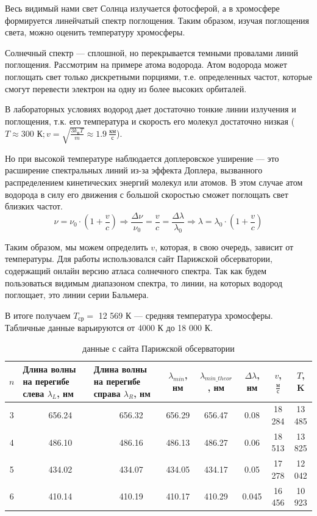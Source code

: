 \documentclass[a4paper,12pt]{article}
\begin{document}
Весь видимый нами свет Солнца излучается фотосферой, а в хромосфере формируется линейчатый спектр поглощения. Таким образом, изучая поглощения света, можно оценить температуру хромосферы.

Солнечный спектр --- сплошной, но перекрывается темными провалами линий поглощения. 
Рассмотрим на примере атома водорода. Атом водорода может поглощать свет только дискретными порциями, т.е. определенных частот, которые смогут перевести электрон на одну из более высоких орбиталей.

В лабораторных условиях водород дает достаточно тонкие линии излучения и поглощения, т.к. его температура и скорость его молекул достаточно низкая ($T \approx 300 \text{ К}; v = \sqrt{\frac{3k_{\text{Б}}T}{m}} \approx 1.9\ \frac{\text{км}}{\text{с}}$).

Но при высокой температуре наблюдается доплеровское уширение — это расширение спектральных линий из-за эффекта Доплера, вызванного распределением кинетических энергий молекул или атомов. В этом случае атом водорода в силу его движения с большой скоростью сможет поглощать свет близких частот.
\[
\nu = \nu_{0}\cdot \left(1 + \frac{v}{c}\right) \Rightarrow \frac{\Delta\nu}{\nu_0} = \frac{v}{c} = \frac{\Delta\lambda}{\lambda_0} \Rightarrow \lambda = \lambda_{0}\cdot \left(1 + \frac{v}{c}\right)    
\]

Таким образом, мы можем определить $v$, которая, в свою очередь, зависит от температуры. 
Для работы использовался сайт Парижской обсерватории, содержащий онлайн версию атласа солнечного спектра. Так как будем пользоваться видимым диапазоном спектра, то 
линии, на которых водород поглощает, это линии серии Бальмера.

В итоге получаем $T_{\text{ср}} = $ 12 569 К --- средняя температура хромосферы. Табличные данные варьируются от 4000 К до 18 000 К.

\begin{table}[H]
    \centering
    \renewcommand{\arraystretch}{1.5} %
    \begin{tabular}{|c|m{2.6cm}|m{2.6cm}|c|c|c|c|c|} 
        \hline
        $n$ & Длина волны на перегибе слева $\lambda_L$, нм & Длина волны на перегибе справа $\lambda_R$, нм & $\lambda_{min}$, нм & $\lambda_{min\_theor}$, нм & $\Delta\lambda$, нм & $v$, $\frac{\text{м}}{\text{с}}$ & $T$, K \\ \hline
        3 &\ \ \ \ \ \ 656.24 &\ \ \ \ \ \ 656.32 & 656.29 & 656.47 & 0.08 & 18 284 & 13 485 \\ \hline
        4 &\ \ \ \ \ \ 486.10 &\ \ \ \ \ \ 486.16 & 486.13 & 486.27 & 0.06 & 18 513 & 13 825 \\ \hline
        5 &\ \ \ \ \ \ 434.02 &\ \ \ \ \ \ 434.07 & 434.05 & 434.17 & 0.05 & 17 278 & 12 042 \\ \hline
        6 &\ \ \ \ \ \ 410.14 &\ \ \ \ \ \ 410.19 & 410.17 & 410.29 & 0.045 & 16 456 & 10 923 \\ \hline
    \end{tabular}
    \caption{данные с сайта Парижской обсерватории}
\end{table}
\end{document}
